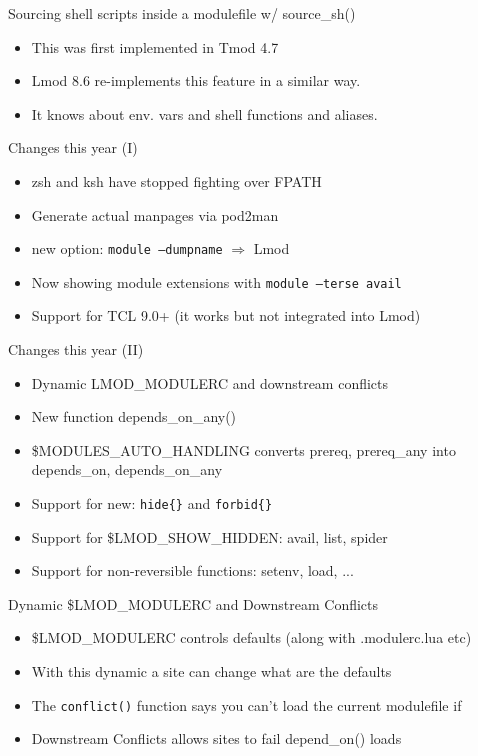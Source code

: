 \documentclass{beamer}
\begin{document}
\begin{frame}{Sourcing shell scripts inside a modulefile w/ source\_sh()}
  \begin{itemize}
    \item This was first implemented in Tmod 4.7
    \item Lmod 8.6 re-implements this feature in a similar way.
    \item It knows about env. vars and shell functions and aliases.
  \end{itemize}
\end{frame}

\begin{frame}{Changes this year (I)}
  \begin{itemize}
    \item zsh and ksh have stopped fighting over FPATH
    \item Generate actual manpages via pod2man
    \item new option: \texttt{module --dumpname} $\Rightarrow$ Lmod
    \item Now showing module extensions with \texttt{module --terse  avail}
    \item Support for TCL 9.0+ (it works but not integrated into Lmod)
  \end{itemize}
\end{frame}

\begin{frame}{Changes this year (II)}
  \begin{itemize}
    \item Dynamic LMOD\_MODULERC and downstream conflicts
    \item New function depends\_on\_any()
    \item \$MODULES\_AUTO\_HANDLING converts prereq, prereq\_any into
      depends\_on, depends\_on\_any
    \item Support for new: \texttt{hide\{\}} and \texttt{forbid\{\}}
    \item Support for \$LMOD\_SHOW\_HIDDEN: avail, list, spider
    \item Support for non-reversible functions: setenv, load, ...
  \end{itemize}
\end{frame}

\begin{frame}{Dynamic \$LMOD\_MODULERC and Downstream Conflicts}
  \begin{itemize}
    \item \$LMOD\_MODULERC controls defaults (along with .modulerc.lua etc)
    \item With this dynamic a site can change what are the defaults
    \item The \texttt{conflict()} function says you can't load the
      current modulefile if 
    \item Downstream Conflicts allows sites to fail depend\_on() loads 
  \end{itemize}
\end{frame}
\end{document}
